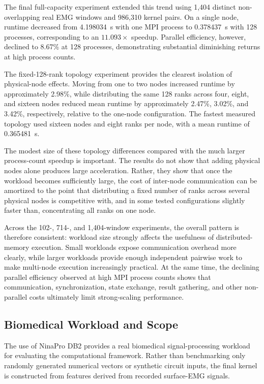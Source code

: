 \documentclass[pdflatex,sn-mathphys-num]{sn-jnl}%
\theoremstyle{thmstyleone}%
\theoremstyle{thmstyletwo}%
\theoremstyle{thmstylethree}%
\begin{document}
The final full-capacity experiment extended this trend using 1,404 distinct
non-overlapping real EMG windows and 986,310 kernel pairs. On a single node,
runtime decreased from 4.198034~s with one MPI process to 0.378437~s with
128 processes, corresponding to an \(11.093\times\) speedup. Parallel
efficiency, however, declined to 8.67\% at 128 processes, demonstrating
substantial diminishing returns at high process counts.

The fixed-128-rank topology experiment provides the clearest isolation of
physical-node effects. Moving from one to two nodes increased runtime by
approximately 2.98\%, while distributing the same 128 ranks across four,
eight, and sixteen nodes reduced mean runtime by approximately 2.47\%,
3.02\%, and 3.42\%, respectively, relative to the one-node configuration.
The fastest measured topology used sixteen nodes and eight ranks per node,
with a mean runtime of 0.365481~s.

The modest size of these topology differences compared with the much larger
process-count speedup is important. The results do not show that adding
physical nodes alone produces large acceleration. Rather, they show that once
the workload becomes sufficiently large, the cost of inter-node communication
can be amortized to the point that distributing a fixed number of ranks across
several physical nodes is competitive with, and in some tested configurations
slightly faster than, concentrating all ranks on one node.

Across the 102-, 714-, and 1,404-window experiments, the overall pattern is
therefore consistent: workload size strongly affects the usefulness of
distributed-memory execution. Small workloads expose communication overhead
more clearly, while larger workloads provide enough independent pairwise work
to make multi-node execution increasingly practical. At the same time, the
declining parallel efficiency observed at high MPI process counts shows that
communication, synchronization, state exchange, result gathering, and other
non-parallel costs ultimately limit strong-scaling performance.


\subsection{Biomedical Workload and Scope}
\label{subsec:biomedical-discussion}

The use of NinaPro DB2 provides a real biomedical signal-processing workload
for evaluating the computational framework. Rather than benchmarking only
randomly generated numerical vectors or synthetic circuit inputs, the final
kernel is constructed from features derived from recorded surface-EMG signals.
\end{document}
